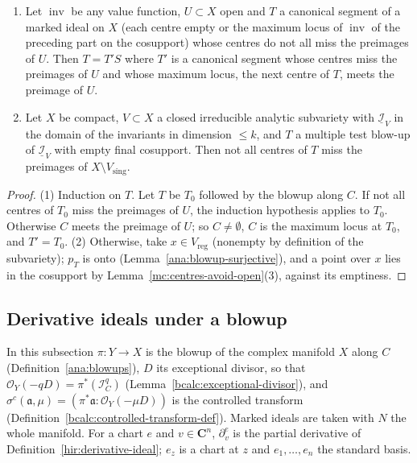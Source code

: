 \begin{lemma}
\label{mc:first-centre-exists}
\leanok
\begin{enumerate}
\item Let \(\operatorname{inv}\) be any value function, \(U\subset X\) open and \(T\) a canonical segment of a marked ideal on \(X\) (each centre empty or the
maximum locus of \(\operatorname{inv}\) of the preceding part on the cosupport) whose centres do not all miss the preimages of \(U\). Then \(T=T'S\) where \(T'\) is a
canonical segment whose centres miss the preimages of \(U\) and whose maximum locus, the next centre of \(T\), meets the preimage of \(U\).
\item Let \(X\) be compact, \(V\subset X\) a closed irreducible analytic subvariety with \(\underline{\mathcal I}_V\) in the domain of the invariants in
dimension \(\le k\), and \(T\) a multiple test blow-up of \(\underline{\mathcal I}_V\) with empty final cosupport. Then not all centres of \(T\) miss the preimages of
\(X\setminus V_{\mathrm{sing}}\).
\end{enumerate}
\end{lemma}
\begin{proof}
\leanok
(1) Induction on \(T\). Let \(T\) be \(T_0\) followed by the blowup along \(C\). If not all centres of \(T_0\) miss the preimages of \(U\), the induction hypothesis
applies to \(T_0\). Otherwise \(C\) meets the preimage of \(U\); so \(C\neq\emptyset\), \(C\) is the maximum locus at \(T_0\), and \(T'=T_0\).
(2) Otherwise, take \(x\in V_{\mathrm{reg}}\) (nonempty by definition of the subvariety); \(p_T\) is onto (Lemma~\ref{ana:blowup-surjective}), and a point over \(x\) lies in the
cosupport by Lemma~\ref{mc:centres-avoid-open}(3), against its emptiness.
\end{proof}

\subsection{Derivative ideals under a blowup}

In this subsection \(\pi\colon Y\to X\) is the blowup of the complex manifold \(X\) along \(C\)
(Definition~\ref{ana:blowups}), \(D\) its exceptional divisor, so that \(\mathcal O_Y(-qD)=\pi^*(\mathcal I_C^q)\)
(Lemma~\ref{bcalc:exceptional-divisor}), and \(\sigma^c(\mathfrak a,\mu)=(\pi^*\mathfrak a:\mathcal O_Y(-\mu D))\) is the
controlled transform (Definition~\ref{bcalc:controlled-transform-def}). Marked ideals are taken with \(N\) the whole
manifold. For a chart \(e\) and \(v\in\mathbf C^n\), \(\partial^e_v\) is the partial derivative of
Definition~\ref{hir:derivative-ideal}; \(e_z\) is a chart at \(z\) and \(e_1,\dots,e_n\) the standard basis.


